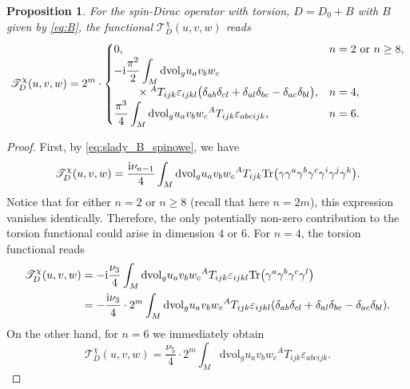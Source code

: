 \documentclass[10pt,a4paper]{amsart}
\numberwithin{equation}{section}
\newtheorem{Proposition}[Theorem]{Proposition}
\theoremstyle{definition}
\def\Tr{\mathrm{Tr}}
\def\dv{\mathrm{dvol}_g}
\begin{document}
\begin{Proposition}
	For the spin-Dirac operator with torsion, $D=D_0+B$ with $B$ given by \eqref{eq:B}, the functional $\mathscr{T}_{D}^\chi(u,v,w)$ reads
 \[
 \mathscr{T}_{D}^\chi(u,v,w)=2^m \cdot \begin{cases}
 0, & n=2 \text{ or } n\geq 8,\\
 \displaystyle -{\rm i} \frac{\pi^2}{2} \int_M \dv u_a v_b w_c &\\
 \qquad {} \times {}^AT_{ijk} \varepsilon_{ijkl}
 \bigl(\delta_{ab}\delta_{cl} + \delta_{al}\delta_{bc}-\delta_{ac}\delta_{bl}\bigr), & n=4,\\
\displaystyle \frac{\pi^3}{4}\int_M\dv u_av_b w_c {}^AT_{ijk} \varepsilon_{abcijk}, & n=6.
 \end{cases}
 \]
\end{Proposition}

\begin{proof}
First, by \eqref{eq:slady_B_spinowe}, we have
\[
 \mathscr{T}^\chi_D(u,v,w)=\frac{{\rm i}\nu_{n-1}}{4}\int_M \dv u_a v_b w_c {}^AT_{ijk} \Tr\bigl(\gamma \gamma^a\gamma^b\gamma^c\gamma^i\gamma^j\gamma^k\bigr).
\]
Notice that for either $n=2$ or $n\geq 8$ (recall that here $n=2m$), this expression vanishes identically. Therefore, the only potentially non-zero contribution to the torsion functional could arise in dimension $4$ or $6$. For $n=4$, the torsion functional reads
\begin{align*}
 \mathscr{T}^\chi_D(u,v,w)&=-{\rm i}\frac{\nu_3}{4}\int_M \dv u_a v_b w_c {}^AT_{ijk} \varepsilon_{ijkl} \Tr\bigl(\gamma^a\gamma^b \gamma^c \gamma^l\bigr)
 \\
 &=-\frac{{\rm i}\nu_3}{4} \cdot 2^m\int_M \dv u_a v_b w_c {}^AT_{ijk} \varepsilon_{ijkl}
 (\delta_{ab}\delta_{cl} + \delta_{al}\delta_{bc}-\delta_{ac}\delta_{bl}).
 \end{align*}
On the other hand, for $n=6$ we immediately obtain
\[
 \mathscr{T}^\chi_D(u,v,w)=\frac{\nu_5}{4}\cdot 2^m\int_M\dv u_av_b w_c {}^AT_{ijk} \varepsilon_{abcijk}.\tag*{\qed}
\] \renewcommand{\qed}{}
\end{proof}
\end{document}

